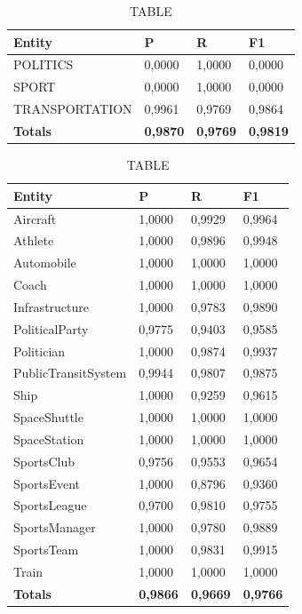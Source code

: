\documentclass[thesis=M,english]{FITthesis}[2018/05/30]
\begin{document}
	\begin{table}[H]\centering
		\caption{TABLE}
		\label{}
		\begin{tabular}{|l|l|l|l|}
			\hline {\textbf{Entity}} & {\textbf{P}} & {\textbf{R}} & {\textbf{F1}}\\\hline
				POLITICS & 0,0000 & 1,0000 & 0,0000\\
				SPORT & 0,0000 & 1,0000 & 0,0000\\
				TRANSPORTATION & 0,9961 & 0,9769 & 0,9864\\\hline
				\textbf{Totals} & \textbf{0,9870} & \textbf{0,9769} & \textbf{0,9819}\\\hline
		\end{tabular}
	\end{table}	
		


\begin{table}[H]\centering
		\caption{TABLE}
		\label{}
		\begin{tabular}{|l|l|l|l|}
			\hline {\textbf{Entity}} & {\textbf{P}} & {\textbf{R}} & {\textbf{F1}}\\\hline
				Aircraft & 1,0000 & 0,9929 & 0,9964\\
				Athlete & 1,0000 & 0,9896 & 0,9948\\
				Automobile & 1,0000 & 1,0000 & 1,0000\\ 
				Coach & 1,0000 & 1,0000 & 1,0000\\
				Infrastructure & 1,0000 & 0,9783 & 0,9890\\
				PoliticalParty & 0,9775 & 0,9403 & 0,9585\\
				Politician & 1,0000 & 0,9874 & 0,9937\\
				PublicTransitSystem & 0,9944 & 0,9807 & 0,9875\\
				Ship & 1,0000 & 0,9259 & 0,9615\\
				SpaceShuttle & 1,0000 & 1,0000 & 1,0000\\
				SpaceStation & 1,0000 & 1,0000 & 1,0000\\ 
				SportsClub & 0,9756 & 0,9553 & 0,9654\\
				SportsEvent & 1,0000 & 0,8796 & 0,9360\\
				SportsLeague & 0,9700 & 0,9810 & 0,9755\\
				SportsManager & 1,0000 & 0,9780 & 0,9889\\
				SportsTeam & 1,0000 & 0,9831 & 0,9915\\
				Train & 1,0000 & 1,0000 & 1,0000\\\hline
				\textbf{Totals} & \textbf{0,9866} & \textbf{0,9669} & \textbf{0,9766}\\\hline
		\end{tabular}
	\end{table}
\end{document}
